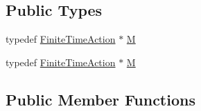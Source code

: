 \subsection*{Public Types}
\begin{DoxyCompactItemize}
\item 
typedef \hyperlink{classFiniteTimeAction}{Finite\+Time\+Action} $\ast$ \hyperlink{classSpawn_a3b3334ea4e6fe3664be6cbea9743db88}{M}
\item 
typedef \hyperlink{classFiniteTimeAction}{Finite\+Time\+Action} $\ast$ \hyperlink{classSpawn_a3b3334ea4e6fe3664be6cbea9743db88}{M}
\end{DoxyCompactItemize}
\subsection*{Public Member Functions}
